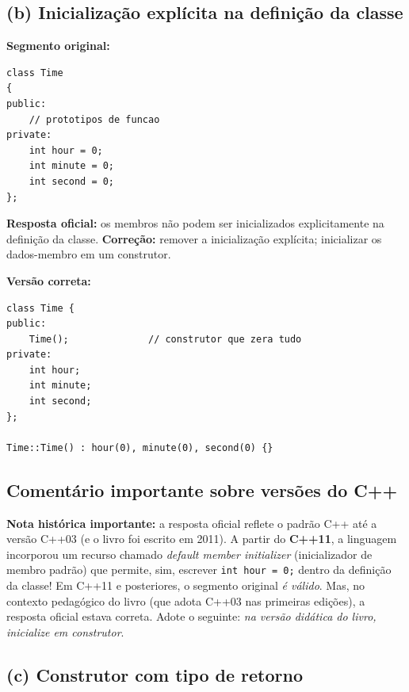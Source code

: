 \documentclass[11pt,a4paper]{article}
\begin{document}
\subsection*{(b) Inicializa\c{c}\~ao expl\'icita na defini\c{c}\~ao da classe}

\textbf{Segmento original:}
\begin{lstlisting}[style=cppcode,numbers=none]
class Time
{
public:
    // prototipos de funcao
private:
    int hour = 0;
    int minute = 0;
    int second = 0;
};
\end{lstlisting}

\begin{resposta}
\textbf{Resposta oficial:} os membros n\~ao podem ser inicializados explicitamente na defini\c{c}\~ao da classe. \textbf{Corre\c{c}\~ao:} remover a inicializa\c{c}\~ao expl\'icita; inicializar os dados-membro em um construtor.
\end{resposta}

\textbf{Vers\~ao correta:}
\begin{lstlisting}[style=cppcode,numbers=none]
class Time {
public:
    Time();              // construtor que zera tudo
private:
    int hour;
    int minute;
    int second;
};

Time::Time() : hour(0), minute(0), second(0) {}
\end{lstlisting}

\subsection*{Coment\'ario importante sobre vers\~oes do C++}

\begin{obseng}
\textbf{Nota hist\'orica importante:} a resposta oficial reflete o padr\~ao C++ at\'e a vers\~ao C++03 (e o livro foi escrito em 2011). A partir do \textbf{C++11}, a linguagem incorporou um recurso chamado \emph{default member initializer} (inicializador de membro padr\~ao) que permite, sim, escrever \texttt{int hour = 0;} dentro da defini\c{c}\~ao da classe! Em C++11 e posteriores, o segmento original \emph{\'e v\'alido}. Mas, no contexto pedag\'ogico do livro (que adota C++03 nas primeiras edi\c{c}\~oes), a resposta oficial estava correta. Adote o seguinte: \emph{na vers\~ao did\'atica do livro, inicialize em construtor}.
\end{obseng}

\subsection*{(c) Construtor com tipo de retorno}
\end{document}
